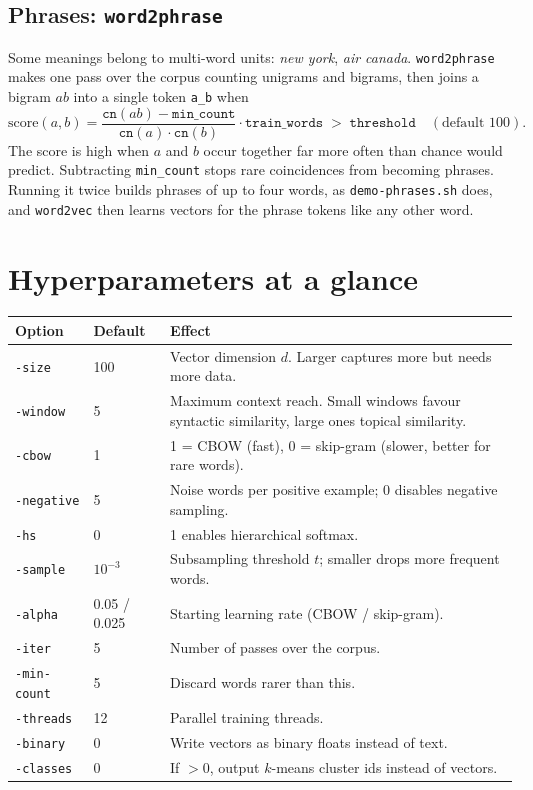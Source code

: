 \documentclass[11pt,a4paper]{article}
\newcommand{\code}[1]{\texttt{#1}}
\begin{document}
\subsection{Phrases: \texttt{word2phrase}}

Some meanings belong to multi-word units: \emph{new york}, \emph{air canada}.
\code{word2phrase} makes one pass over the corpus counting unigrams and bigrams, then
joins a bigram $ab$ into a single token \code{a\_b} when
\[
  \text{score}(a,b) = \frac{\code{cn}(ab) - \code{min\_count}}{\code{cn}(a)\cdot\code{cn}(b)}\cdot \code{train\_words} \;>\; \code{threshold}
  \quad(\text{default }100).
\]
The score is high when $a$ and $b$ occur together far more often than chance would
predict. Subtracting \code{min\_count} stops rare coincidences from becoming phrases.
Running it twice builds phrases of up to four words, as \code{demo-phrases.sh} does,
and \code{word2vec} then learns vectors for the phrase tokens like any other word.

\section{Hyperparameters at a glance}

\begin{center}
\small
\begin{tabularx}{\linewidth}{@{}llX@{}}
\toprule
Option & Default & Effect \\
\midrule
\code{-size} & 100 & Vector dimension $d$. Larger captures more but needs more data. \\
\code{-window} & 5 & Maximum context reach. Small windows favour syntactic similarity, large ones topical similarity. \\
\code{-cbow} & 1 & 1 = CBOW (fast), 0 = skip-gram (slower, better for rare words). \\
\code{-negative} & 5 & Noise words per positive example; 0 disables negative sampling. \\
\code{-hs} & 0 & 1 enables hierarchical softmax. \\
\code{-sample} & $10^{-3}$ & Subsampling threshold $t$; smaller drops more frequent words. \\
\code{-alpha} & 0.05 / 0.025 & Starting learning rate (CBOW / skip-gram). \\
\code{-iter} & 5 & Number of passes over the corpus. \\
\code{-min-count} & 5 & Discard words rarer than this. \\
\code{-threads} & 12 & Parallel training threads. \\
\code{-binary} & 0 & Write vectors as binary floats instead of text. \\
\code{-classes} & 0 & If $>0$, output $k$-means cluster ids instead of vectors. \\
\bottomrule
\end{tabularx}
\end{center}
\end{document}
